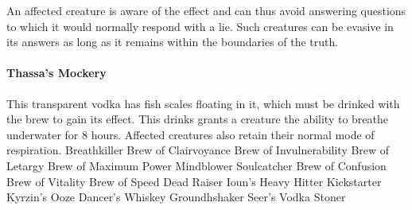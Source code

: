     An affected creature is aware of the effect and can thus avoid answering questions to which it would normally respond with a lie.
    Such creatures can be evasive in its answers as long as it remains within the boundaries of the truth.
\paragraph{Thassa's Mockery} %
    This transparent vodka has fish scales floating in it, which must be drinked with the brew to gain its effect.
    This drinks grants a creature the ability to breathe underwater for 8 hours.
    Affected creatures also retain their normal mode of respiration.
Breathkiller %
Brew of Clairvoyance
Brew of Invulnerability
Brew of Letargy %
Brew of Maximum Power
Mindblower %
Soulcatcher %
Brew of Confusion %
Brew of Vitality %
Brew of Speed %
Dead Raiser %
Ioun's Heavy Hitter %
Kickstarter %
Kyrzin's Ooze %
Dancer's Whiskey %
Groundhshaker %
Seer's Vodka %
Stoner %
